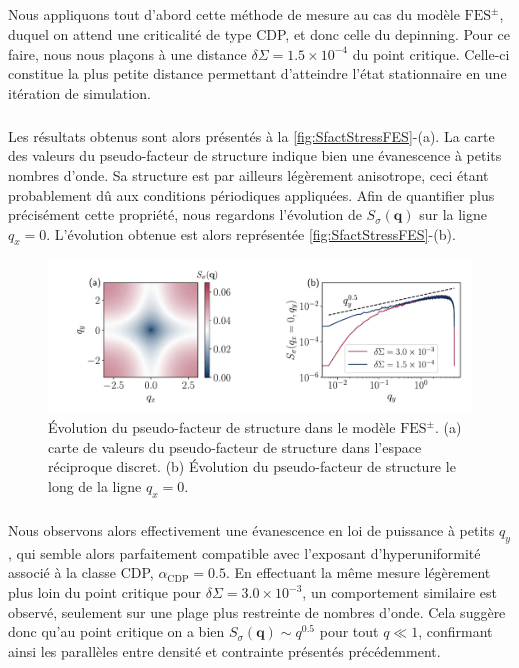 \subparagraph{}Nous appliquons tout d'abord cette méthode de mesure au cas du modèle $\text{FES}^\pm$, duquel on attend une criticalité de type CDP, et donc celle du depinning. Pour ce faire, nous nous plaçons à une distance $\delta\Sigma = 1.5\times 10^{-4}$ du point critique. Celle-ci constitue la plus petite distance permettant d'atteindre l'état stationnaire en une itération de simulation.

\subparagraph{}Les résultats obtenus sont alors présentés à la \autoref{fig:SfactStressFES}-(a). La carte des valeurs du pseudo-facteur de structure indique bien une évanescence à petits nombres d'onde. Sa structure est par ailleurs légèrement anisotrope, ceci étant probablement dû aux conditions périodiques appliquées. Afin de quantifier plus précisément cette propriété, nous regardons l'évolution de $S_\sigma(\mathbf{q})$ sur la ligne $q_x = 0$. L'évolution obtenue est alors représentée \autoref{fig:SfactStressFES}-(b).

\begin{figure}[h]
	\centering	\includegraphics[width=\textwidth]{Chapitre4/Figures/Correlations/Sfact_SRPNC.pdf}
	\caption{Évolution du pseudo-facteur de structure dans le modèle $\text{FES}^\pm$. (a) carte de valeurs du pseudo-facteur de structure dans l'espace réciproque discret. (b) Évolution du pseudo-facteur de structure le long de la ligne $q_x=0$.}
	\label{fig:SfactStressFES}
\end{figure}

\subparagraph{}Nous observons alors effectivement une évanescence en loi de puissance à petits $q_y$, qui semble alors parfaitement compatible avec l'exposant d'hyperuniformité associé à la classe CDP, $\alpha_\text{CDP} = 0.5$. En effectuant la même mesure légèrement plus loin du point critique pour $\delta\Sigma = 3.0\times 10^{-3}$, un comportement similaire est observé, seulement sur une plage plus restreinte de nombres d'onde. Cela suggère donc qu'au point critique on a bien $S_\sigma(\mathbf{q})\sim q^{0.5}$ pour tout $q\ll 1$, confirmant ainsi les parallèles entre densité et contrainte présentés précédemment.

